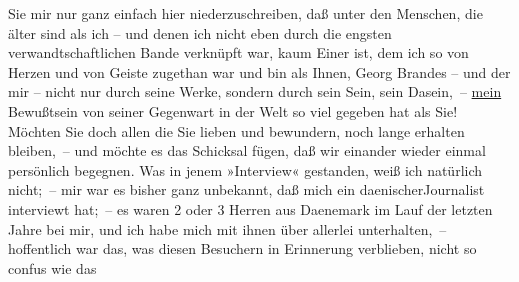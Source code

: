 \begin{ledgroupsized}[t]{13cm}
               Sie mir nur ganz einfach hier niederzuschreiben, daß unter den Menschen, die älter
               sind als ich – und denen ich nicht eben durch die engsten verwandtschaftlichen Bande
               verknüpft war, kaum Einer ist, dem ich so von Herzen und von Geiste zugethan war und
               bin als Ihnen, Georg Brandes – und der mir – nicht nur durch seine Werke, sondern
               durch sein Sein, sein Dasein, – \uline{mein} Bewußtsein von
               seiner Gegenwart {\pb}in der Welt so viel gegeben hat
               als Sie! Möchten Sie doch allen die Sie lieben und bewundern, noch lange erhalten
               bleiben, – und möchte es das Schicksal fügen, daß wir einander wieder einmal
               persönlich begegnen.\pend
           \pstart
           Was in jenem »Interview«
               gestanden, weiß ich natürlich nicht; – mir war es bisher ganz unbekannt, daß mich ein
                  daenischerJournalist interviewt hat; – es
               waren 2 oder 3 Herren aus Daenemark im Lauf der
               letzten Jahre bei mir, und ich habe \introOben{}mich\introOben{} mit ihnen \introOben{}über allerlei\introOben{} unterhalten, – hoffentlich war das, was diesen
               Besuchern in Erinnerung verblieben, nicht so confus wie das \label{K_L02376_1v}
\end{ledgroupsized}
